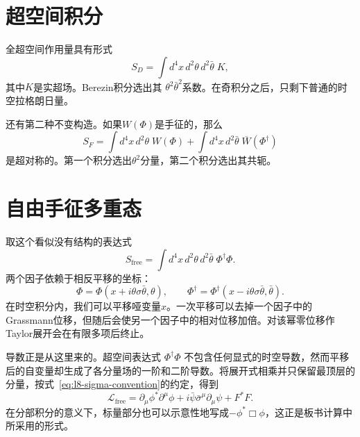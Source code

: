 \section{超空间积分}

全超空间作用量具有形式
\begin{equation}
S_D=\int d^4x\,d^2\theta\,d^2\bar\theta\;K,
\label{eq:l8-D-term-action}
\end{equation}
其中\(K\)是实超场。Berezin积分选出其
\(\theta^2\bar\theta^2\)系数。在奇积分之后，只剩下普通的时空拉格朗日量。

还有第二种不变构造。如果\(W(\Phi)\)是手征的，那么
\begin{equation}
S_F=\int d^4x\,d^2\theta\;W(\Phi)
+\int d^4x\,d^2\bar\theta\;\overline{W}(\Phi^\dagger)
\label{eq:l8-F-term-action}
\end{equation}
是超对称的。第一个积分选出\(\theta^2\)分量，第二个积分选出其共轭。

\begin{classroomqa}
\end{classroomqa}

\section{自由手征多重态}

取这个看似没有结构的表达式
\begin{equation}
S_{\mathrm{free}}
=\int d^4x\,d^2\theta\,d^2\bar\theta\;
\Phi^\dagger\Phi.
\label{eq:l8-free-superaction}
\end{equation}
两个因子依赖于相反平移的坐标：
\begin{equation}
\Phi=\Phi(x+i\theta\sigma\bar\theta,\theta),
\qquad
\Phi^\dagger
=\Phi^\dagger(x-i\theta\sigma\bar\theta,\bar\theta).
\end{equation}
在时空积分内，我们可以平移哑变量\(x\)。一次平移可以去掉一个因子中的Grassmann位移，但随后会使另一个因子中的相对位移加倍。对该幂零位移作Taylor展开会在有限多项后终止。

导数正是从这里来的。超空间表达式
\(\Phi^\dagger\Phi\)
不包含任何显式的时空导数，然而平移后的自变量却生成了各分量场的一阶和二阶导数。将展开式相乘并只保留最顶层的分量，按式~\eqref{eq:l8-sigma-convention}的约定，得到
\begin{equation}
\mathcal L_{\mathrm{free}}
=\partial_\mu\phi^\ast\partial^\mu\phi
+i\bar\psi\bar\sigma^\mu\partial_\mu\psi
+F^\ast F.
\label{eq:l8-free-component-lagrangian}
\end{equation}
在分部积分的意义下，标量部分也可以示意性地写成\(-\phi^\ast\Box\phi\)，这正是板书计算中所采用的形式。

